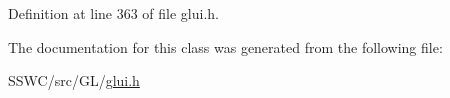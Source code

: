 Definition at line 363 of file glui.\+h.



The documentation for this class was generated from the following file\+:\begin{DoxyCompactItemize}
\item 
S\+S\+W\+C/src/\+G\+L/\hyperlink{glui_8h}{glui.\+h}\end{DoxyCompactItemize}

